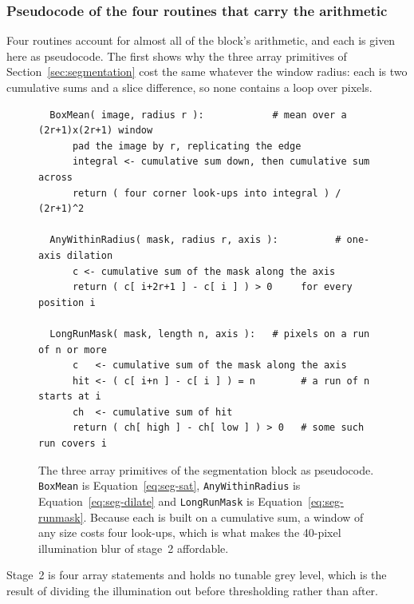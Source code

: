 \subsubsection{Pseudocode of the four routines that carry the arithmetic}

Four routines account for almost all of the block's arithmetic, and each is given here as pseudocode.
The first shows why the three array primitives of Section~\ref{sec:segmentation} cost the same whatever the window radius: each is two cumulative sums and a slice difference, so none contains a loop over pixels.

\begin{figure}[h]
\centering
\fontsize{8.5}{10.2}\selectfont
\begin{verbatim}
  BoxMean( image, radius r ):            # mean over a (2r+1)x(2r+1) window
      pad the image by r, replicating the edge
      integral <- cumulative sum down, then cumulative sum across
      return ( four corner look-ups into integral ) / (2r+1)^2

  AnyWithinRadius( mask, radius r, axis ):          # one-axis dilation
      c <- cumulative sum of the mask along the axis
      return ( c[ i+2r+1 ] - c[ i ] ) > 0     for every position i

  LongRunMask( mask, length n, axis ):   # pixels on a run of n or more
      c   <- cumulative sum of the mask along the axis
      hit <- ( c[ i+n ] - c[ i ] ) = n        # a run of n starts at i
      ch  <- cumulative sum of hit
      return ( ch[ high ] - ch[ low ] ) > 0   # some such run covers i
\end{verbatim}
\caption{The three array primitives of the segmentation block as pseudocode. \texttt{BoxMean} is Equation~\ref{eq:seg-sat}, \texttt{AnyWithinRadius} is Equation~\ref{eq:seg-dilate} and \texttt{LongRunMask} is Equation~\ref{eq:seg-runmask}. Because each is built on a cumulative sum, a window of any size costs four look-ups, which is what makes the 40-pixel illumination blur of stage~2 affordable.}
\label{fig:seg-primspseudo}
\end{figure}

Stage~2 is four array statements and holds no tunable grey level, which is the result of dividing the illumination out before thresholding rather than after.

